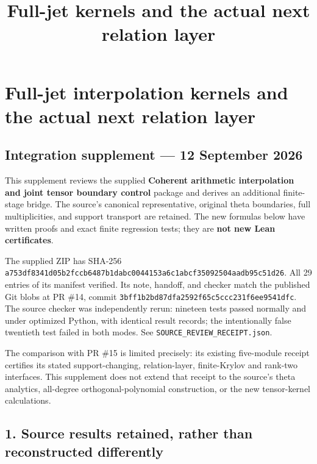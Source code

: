 \documentclass[
]{article}
\title{Full-jet kernels and the actual next relation layer}
\author{}
\date{}
\begin{document}
\maketitle

\section{Full-jet interpolation kernels and the actual next relation
layer}\label{full-jet-interpolation-kernels-and-the-actual-next-relation-layer}

\subsection{Integration supplement --- 12 September
2026}\label{integration-supplement-12-september-2026}

This supplement reviews the supplied \textbf{Coherent arithmetic
interpolation and joint tensor boundary control} package and derives an
additional finite-stage bridge. The source's canonical representative,
original theta boundaries, full multiplicities, and support transport
are retained. The new formulas below have written proofs and exact
finite regression tests; they are \textbf{not new Lean certificates}.

The supplied ZIP has SHA-256
\texttt{a753df8341d05b2fccb6487b1dabc0044153a6c1abcf35092504aadb95c51d26}.
All 29 entries of its manifest verified. Its note, handoff, and checker
match the published Git blobs at PR \#14, commit
\texttt{3bff1b2bd87dfa2592f65c5ccc231f6ee9541dfc}. The source checker
was independently rerun: nineteen tests passed normally and under
optimized Python, with identical result records; the intentionally false
twentieth test failed in both modes. See
\texttt{SOURCE\_REVIEW\_RECEIPT.json}.

The comparison with PR \#15 is limited precisely: its existing
five-module receipt certifies its stated support-changing,
relation-layer, finite-Krylov and rank-two interfaces. This supplement
does not extend that receipt to the source's theta analytics, all-degree
orthogonal-polynomial construction, or the new tensor-kernel
calculations.

\subsection{1. Source results retained, rather than reconstructed
differently}\label{source-results-retained-rather-than-reconstructed-differently}
\end{document}

